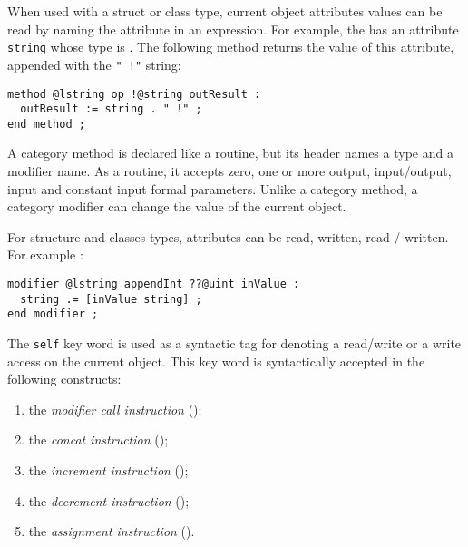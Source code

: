 When used with a struct or class type, current object attributes values can be read by naming the attribute in an expression. For example, the  has an attribute 
\lstinline[language=galgas]!string! whose type is . The following method returns the value of this attribute, appended with the \lstinline[language=galgas]?" !"? string:
\begin{lstlisting}[language=galgas]
method @lstring op !@string outResult :
  outResult := string . " !" ;
end method ;
\end{lstlisting}












A category method is declared like a routine, but its header names a type and a modifier name. As a routine, it accepts zero, one or more output, input/output, input and constant input formal parameters. Unlike a category method, a category modifier can change the value of the current object.

For structure and classes types, attributes can be read, written, read / written. For example :
\begin{lstlisting}[language=galgas]
modifier @lstring appendInt ??@uint inValue :
  string .= [inValue string] ;
end modifier ;
\end{lstlisting}


The \lstinline[language=galgas]!self! key word is used as a syntactic tag for denoting a read/write or a write access on the current object. This key word is syntactically accepted in the following constructs:
\begin{enumerate}
\item the \emph{modifier call instruction} ();
\item the \emph{concat instruction} ();
\item the \emph{increment instruction} ();
\item the \emph{decrement instruction} ();
\item the \emph{assignment instruction} ().
\end{enumerate}

